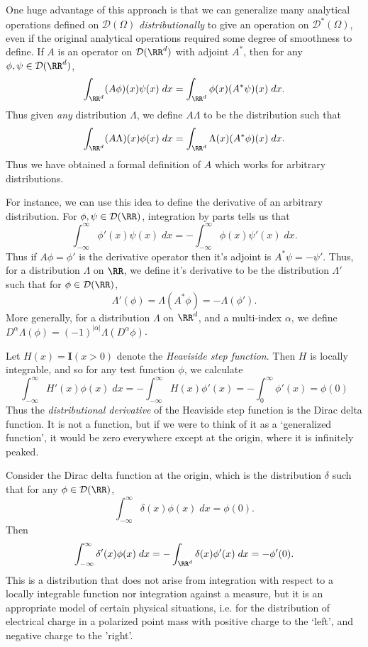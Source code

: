 One huge advantage of this approach is that we can generalize many analytical operations defined on $\mathcal{D}(\Omega)$ \emph{distributionally} to give an operation on $\mathcal{D}^*(\Omega)$, even if the original analytical operations required some degree of smoothness to define. If $A$ is an operator on $\mathcal{D}(\RR^d)$ with adjoint $A^*$, then for any $\phi,\psi \in \mathcal{D}(\RR^d)$,
%
\[ \int_{\RR^d} (A\phi)(x) \psi(x)\; dx = \int_{\RR^d} \phi(x) (A^* \psi)(x)\; dx. \]
%
Thus given \emph{any} distribution $\Lambda$, we define $A \Lambda$ to be the distribution such that
%
\[ \int_{\RR^d} (A \Lambda)(x) \phi(x)\; dx = \int_{\RR^d} \Lambda(x) (A^* \phi)(x)\; dx. \]
%
Thus we have obtained a formal definition of $A$ which works for arbitrary distributions.

For instance, we can use this idea to define the derivative of an arbitrary distribution. For $\phi,\psi \in \mathcal{D}(\RR)$, integration by parts tells us that
%
\[ \int_{-\infty}^\infty \phi'(x) \psi(x)\; dx = - \int_{-\infty}^\infty \phi(x) \psi'(x)\; dx. \]
%
Thus if $A\phi = \phi'$ is the derivative operator then it's adjoint is $A^* \psi = - \psi'$. Thus, for a distribution $\Lambda$ on $\RR$, we define it's derivative to be the distribution $\Lambda'$ such that for $\phi \in \mathcal{D}(\RR)$,
%
\[ \Lambda'(\phi) = \Lambda(A^* \phi) = - \Lambda(\phi'). \]
%
More generally, for a distribution $\Lambda$ on $\RR^d$, and a multi-index $\alpha$, we define $D^\alpha \Lambda(\phi) = (-1)^{|\alpha|} \Lambda(D^\alpha \phi)$.

\begin{example}
    Let $H(x) = \mathbf{I}(x > 0)$ denote the {\it Heaviside step function}. Then $H$ is locally integrable, and so for any test function $\phi$, we calculate
    \[ \int_{-\infty}^\infty H'(x) \phi(x)\; dx = - \int_{-\infty}^\infty H(x) \phi'(x) = - \int_0^\infty \phi'(x) = \phi(0) \]
    Thus the \emph{distributional derivative} of the Heaviside step function is the Dirac delta function. It is not a function, but if we were to think of it as a `generalized function', it would be zero everywhere except at the origin, where it is infinitely peaked.
\end{example}

\begin{example}
    Consider the Dirac delta function at the origin, which is the distribution $\delta$ such that for any $\phi \in \mathcal{D}(\RR)$,
    \[ \int_{-\infty}^\infty \delta(x) \phi(x)\; dx = \phi(0). \]
    Then
    \[ \int_{-\infty}^\infty \delta'(x) \phi(x)\; dx = - \int_{\RR^d} \delta(x) \phi'(x)\; dx = - \phi'(0). \]
    This is a distribution that does not arise from integration with respect to a locally integrable function nor integration against a measure, but it is an appropriate model of certain physical situations, i.e. for the distribution of electrical charge in a polarized point mass with positive charge to the `left', and negative charge to the 'right'.
\end{example}

